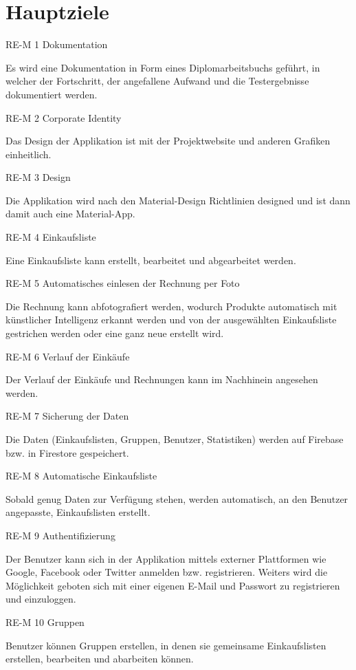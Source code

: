 \hypertarget{hauptziele}{%
\section{Hauptziele}\label{hauptziele}}

RE-M 1 Dokumentation

Es wird eine Dokumentation in Form eines Diplomarbeitsbuchs geführt, in
welcher der Fortschritt, der angefallene Aufwand und die Testergebnisse
dokumentiert werden.

RE-M 2 Corporate Identity

Das Design der Applikation ist mit der Projektwebsite und anderen
Grafiken einheitlich.

RE-M 3 Design

Die Applikation wird nach den Material-Design Richtlinien designed und
ist dann damit auch eine Material-App.

RE-M 4 Einkaufsliste

Eine Einkaufsliste kann erstellt, bearbeitet und abgearbeitet werden.

RE-M 5 Automatisches einlesen der Rechnung per Foto

Die Rechnung kann abfotografiert werden, wodurch Produkte automatisch
mit künstlicher Intelligenz erkannt werden und von der ausgewählten
Einkaufsliste gestrichen werden oder eine ganz neue erstellt wird.

RE-M 6 Verlauf der Einkäufe

Der Verlauf der Einkäufe und Rechnungen kann im Nachhinein angesehen
werden.

RE-M 7 Sicherung der Daten

Die Daten (Einkaufslisten, Gruppen, Benutzer, Statistiken) werden auf
Firebase bzw. in Firestore gespeichert.

RE-M 8 Automatische Einkaufsliste

Sobald genug Daten zur Verfügung stehen, werden automatisch, an den
Benutzer angepasste, Einkaufslisten erstellt.

RE-M 9 Authentifizierung

Der Benutzer kann sich in der Applikation mittels externer Plattformen
wie Google, Facebook oder Twitter anmelden bzw. registrieren. Weiters
wird die Möglichkeit geboten sich mit einer eigenen E-Mail und Passwort
zu registrieren und einzuloggen.

RE-M 10 Gruppen

Benutzer können Gruppen erstellen, in denen sie gemeinsame
Einkaufslisten erstellen, bearbeiten und abarbeiten können.

